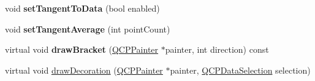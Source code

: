 \begin{DoxyCompactItemize}
\item 
void {\bfseries set\+Tangent\+To\+Data} (bool enabled)\hypertarget{class_q_c_p_selection_decorator_bracket_a93bc6086e53a5e40a08641a7b2e2cdd5}{}\label{class_q_c_p_selection_decorator_bracket_a93bc6086e53a5e40a08641a7b2e2cdd5}

\item 
void {\bfseries set\+Tangent\+Average} (int point\+Count)\hypertarget{class_q_c_p_selection_decorator_bracket_adb2d0876f25a77c88042b70818f1d6e4}{}\label{class_q_c_p_selection_decorator_bracket_adb2d0876f25a77c88042b70818f1d6e4}

\item 
virtual void {\bfseries draw\+Bracket} (\hyperlink{class_q_c_p_painter}{Q\+C\+P\+Painter} $\ast$painter, int direction) const \hypertarget{class_q_c_p_selection_decorator_bracket_a196ddb31e8e32d3295e825084033f50a}{}\label{class_q_c_p_selection_decorator_bracket_a196ddb31e8e32d3295e825084033f50a}

\item 
virtual void \hyperlink{class_q_c_p_selection_decorator_bracket_ae96f09ef95abf81a2514d54149387097}{draw\+Decoration} (\hyperlink{class_q_c_p_painter}{Q\+C\+P\+Painter} $\ast$painter, \hyperlink{class_q_c_p_data_selection}{Q\+C\+P\+Data\+Selection} selection)
\end{DoxyCompactItemize}
